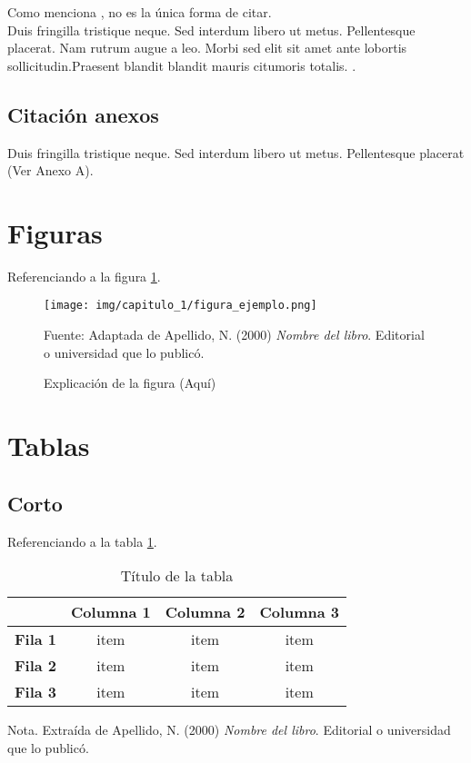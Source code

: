 Como menciona , no es la única
forma de citar.\\

Duis fringilla tristique neque. Sed interdum libero ut metus.
Pellentesque placerat. Nam rutrum augue a leo. Morbi sed 
elit sit amet ante lobortis sollicitudin.Praesent blandit 
blandit mauris citumoris totalis. \cite[p.~7-12]{libro:ejemplo_varios_autores}.

\subsection{Citación anexos}
Duis fringilla tristique neque. Sed interdum libero ut metus.
Pellentesque placerat (Ver Anexo A).

\section{Figuras}
Referenciando a la figura \ref{fig:ejemplo}.

\begin{figure}[H]
    \begin{center}
        \texttt{[image: img/capitulo\_1/figura\_ejemplo.png]}
    \end{center}
    \caption{Explicación de la figura (Aquí)}
    Fuente: Adaptada de Apellido, N. (2000) \textit{Nombre del libro}.
    Editorial o universidad que lo publicó.
    \label{fig:ejemplo}
\end{figure}

\section{Tablas}

\subsection{Corto}
Referenciando a la tabla \ref{tabla:ejemplo}.\\

\begin{table}[H]
    \caption{Título de la tabla}
    \label{tabla:ejemplo}
    \begin{center}
        \begin{tabular}{c|c|c|c|}
            \cline{2-4}
            & \textbf{Columna 1} & \textbf{Columna 2} & \textbf{Columna 3} \\ \hline
            \multicolumn{1}{|c|}{\textbf{Fila 1}} & item               & item               & item               \\ \hline
            \multicolumn{1}{|c|}{\textbf{Fila 2}} & item               & item               & item               \\ \hline
            \multicolumn{1}{|c|}{\textbf{Fila 3}} & item               & item               & item               \\ \hline
        \end{tabular}
    \end{center}
    Nota. Extraída de Apellido, N. (2000) \textit{Nombre del libro}.
    Editorial o universidad que lo publicó.
\end{table}

